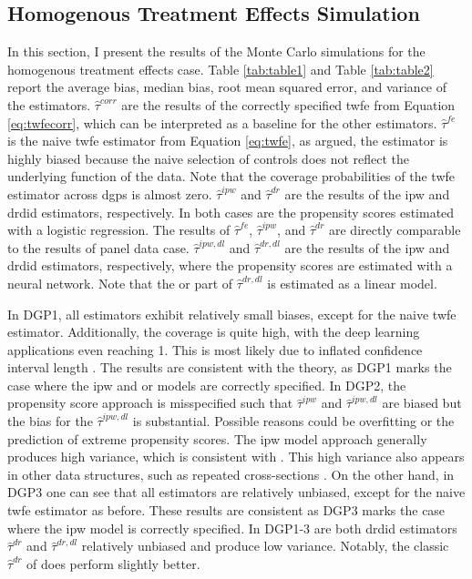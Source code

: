 \subsection{Homogenous Treatment Effects Simulation}



In this section, I present the results of the Monte Carlo simulations for the homogenous treatment effects case.
Table \ref{tab:table1} and Table \ref{tab:table2} report the average bias, median bias, root mean squared error, and variance of the estimators.
$\hat{\tau}^{corr}$ are the results of the correctly specified \ac{twfe} from Equation \ref{eq:twfecorr}, which can be interpreted as a baseline for the other estimators.
$\hat{\tau}^{fe}$ is the naive \ac{twfe} estimator from Equation \ref{eq:twfe}, as argued, the estimator is highly biased because the naive selection of controls does not reflect the underlying function of the data.
Note that the coverage probabilities of the \ac{twfe} estimator across \ac{dgp}s is almost zero.
$\hat{\tau}^{ipw}$ and $\hat{\tau}^{dr}$ are the results of the \ac{ipw} and \ac{drdid} estimators, respectively.
In both cases are the propensity scores estimated with a logistic regression.
The results of $\hat{\tau}^{fe}$, $\hat{\tau}^{ipw}$, and $\hat{\tau}^{dr}$ are directly comparable to the results of \citet{santannaDoublyRobustDifferenceindifferences2020} panel data case.
$\hat{\tau}^{ipw,dl}$ and $\hat{\tau}^{dr,dl}$ are the results of the \ac{ipw} and \ac{drdid} estimators, respectively, where the propensity scores are estimated with a neural network.
Note that the \ac{or} part of $\hat{\tau}^{dr,dl}$ is estimated as a linear model.

In DGP1, all estimators exhibit relatively small biases, except for the naive \ac{twfe} estimator.
Additionally, the coverage is quite high, with the deep learning applications even reaching 1.
This is most likely due to inflated confidence interval length \citep{farrellDeepNeuralNetworks2021}.
The results are consistent with the theory, as DGP1 marks the case where the \ac{ipw} and \ac{or} models are correctly specified.
In DGP2, the propensity score approach is misspecified such that $\hat{\tau}^{ipw}$ and $\hat{\tau}^{ipw,dl}$ are biased but the bias for the  $\hat{\tau}^{ipw,dl}$ is substantial.
Possible reasons could be overfitting or the prediction of extreme propensity scores.
The \ac{ipw} model approach generally produces high variance, which is consistent with \citet{santannaDoublyRobustDifferenceindifferences2020}.
This high variance also appears in other data structures, such as repeated cross-sections \citep{santannaDoublyRobustDifferenceindifferences2020, manfeDifferenceInDifferenceDesignRepeated}.
On the other hand, in DGP3 one can see that all estimators are relatively unbiased, except for the naive \ac{twfe} estimator as before.
These results are consistent as DGP3 marks the case where the \ac{ipw} model is correctly specified.
In DGP1-3 are both \ac{drdid} estimators $\hat{\tau}^{dr}$ and $\hat{\tau}^{dr,dl}$ relatively unbiased and produce low variance.
Notably, the classic $\hat{\tau}^{dr}$ of \citet{santannaDoublyRobustDifferenceindifferences2020} does perform slightly better.


